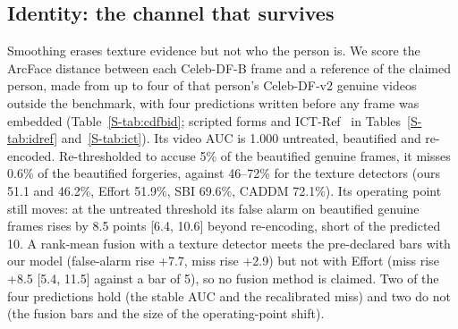 \documentclass[conference]{IEEEtran}
\begin{document}
\subsection{Identity: the channel that survives}
\label{sec:identity}
Smoothing erases texture evidence but not who the person is. We score the ArcFace distance between each Celeb-DF-B frame and
a reference of the claimed person, made from up to four of that person's Celeb-DF-v2 genuine videos outside the benchmark, with
four predictions written before any frame was embedded (Table~\ref{S-tab:cdfbid}; scripted forms and ICT-Ref~\cite{ict2022} in
Tables~\ref{S-tab:idref} and~\ref{S-tab:ict}). Its video AUC is 1.000 untreated, beautified and re-encoded. Re-thresholded to
accuse 5\% of the beautified genuine frames, it misses 0.6\% of the beautified forgeries, against 46--72\% for the texture
detectors (ours 51.1 and 46.2\%, Effort 51.9\%, SBI 69.6\%, CADDM 72.1\%). Its operating point still moves: at the untreated
threshold its false alarm on beautified genuine frames rises by 8.5 points [6.4, 10.6] beyond re-encoding, short of the
predicted 10. A rank-mean fusion with a texture detector meets the pre-declared bars with our model (false-alarm rise +7.7, miss
rise +2.9) but not with Effort (miss rise +8.5 [5.4, 11.5] against a bar of 5), so no fusion method is claimed. Two of the four predictions hold (the stable AUC and the recalibrated miss) and two do not (the fusion bars and the size of the operating-point shift).
\end{document}
